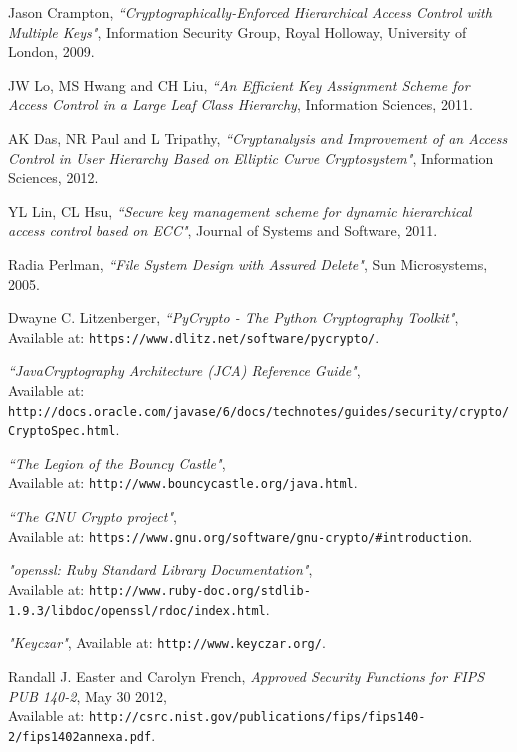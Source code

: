 \documentclass[12pt, titlepage]{article}
\begin{document}
\begin{thebibliography}{10}
Jason Crampton, \emph{``Cryptographically-Enforced Hierarchical
Access Control with Multiple Keys"}, Information Security Group, Royal Holloway, University of London, 2009.

JW Lo, MS Hwang and CH Liu, \emph{``An Efficient Key Assignment Scheme for Access Control in a Large Leaf Class Hierarchy}, Information Sciences, 2011.

AK Das, NR Paul and L Tripathy, \emph{``Cryptanalysis and Improvement of an Access Control in User Hierarchy Based on Elliptic Curve Cryptosystem"}, Information Sciences, 2012.

YL Lin, CL Hsu, \emph{``Secure key management scheme for dynamic hierarchical access control based on ECC"}, Journal of Systems and Software, 2011.

Radia Perlman, \emph{``File System Design with Assured Delete"}, Sun Microsystems, 2005.

Dwayne C. Litzenberger, \emph{``PyCrypto - The Python Cryptography Toolkit"},
\\ Available at: \texttt{https://www.dlitz.net/software/pycrypto/}.

\emph{``Java\texttrademark Cryptography Architecture (JCA) Reference Guide"},
\\ Available at: \texttt{http://docs.oracle.com/javase/6/docs/technotes/guides/security/crypto/CryptoSpec.html}.

\emph{``The Legion of the Bouncy Castle"},
\\ Available at: \texttt{http://www.bouncycastle.org/java.html}.

\emph{``The GNU Crypto project"},
\\ Available at: \texttt{https://www.gnu.org/software/gnu-crypto/\#introduction}.

\emph{"openssl: Ruby Standard Library Documentation"},
\\ Available at: \texttt{http://www.ruby-doc.org/stdlib-1.9.3/libdoc/openssl/rdoc/index.html}.

\emph{"Keyczar"}, Available at: \texttt{http://www.keyczar.org/}.

Randall J. Easter and Carolyn French, \emph{Approved Security Functions
for FIPS PUB 140-2}, May 30 2012,
\\ Available at: \texttt{http://csrc.nist.gov/publications/fips/fips140-2/fips1402annexa.pdf}.


\end{thebibliography}
\end{document}
